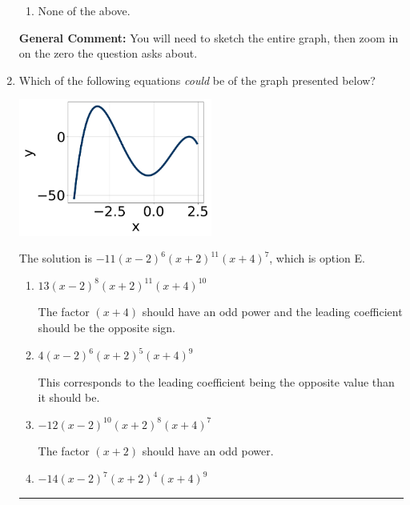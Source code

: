 \documentclass{extbook}[14pt]
\newcommand{\litem}[1]{\item #1

\rule{\textwidth}{0.4pt}}
\begin{document}
\begin{enumerate}
{\begin{enumerate}[label=\Alph*.]
\item None of the above.\end{enumerate}
\textbf{General Comment:} You will need to sketch the entire graph, then zoom in on the zero the question asks about.
}
\litem{
Which of the following equations \textit{could} be of the graph presented below?

\begin{center}
    \includegraphics[width=0.5\textwidth]{../Figures/polyGraphToFunctionB.png}
\end{center}


The solution is \( -11(x - 2)^{6} (x + 2)^{11} (x + 4)^{7} \), which is option E.\begin{enumerate}[label=\Alph*.]
\item \( 13(x - 2)^{8} (x + 2)^{11} (x + 4)^{10} \)

The factor $(x + 4)$ should have an odd power and the leading coefficient should be the opposite sign.
\item \( 4(x - 2)^{6} (x + 2)^{5} (x + 4)^{9} \)

This corresponds to the leading coefficient being the opposite value than it should be.
\item \( -12(x - 2)^{10} (x + 2)^{8} (x + 4)^{7} \)

The factor $(x + 2)$ should have an odd power.
\item \( -14(x - 2)^{7} (x + 2)^{4} (x + 4)^{9} \)


\end{enumerate}}
\end{enumerate}
\end{document}
